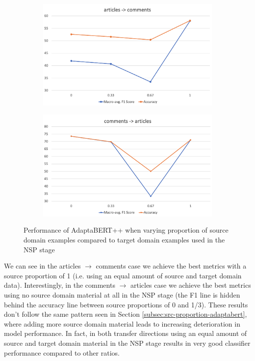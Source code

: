 \begin{figure}[ht]
    \centering
    \begin{subfigure}{\textwidth}
        \centering
        \includegraphics[scale=0.24]{0-img/ner-src-proportion-articles-comments.png}
    \end{subfigure}
    \begin{subfigure}{\textwidth}
        \centering
        \includegraphics[scale=0.24]{0-img/ner-src-proportion-comments-articles.png}
    \end{subfigure}
    \caption{Performance of AdaptaBERT++ when varying proportion of source domain examples compared to target domain examples used in the NSP stage}
    \label{fig:ner-src-proportion}
\end{figure}

We can see in the articles $ \rightarrow $ comments case we achieve the best metrics with a source proportion of 1 (i.e. using an equal amount of source and target domain data). Interestingly, in the comments $ \rightarrow $ articles case we achieve the best metrics using no source domain material at all in the NSP stage (the F1 line is hidden behind the accuracy line between source proportions of 0 and 1/3). These results don't follow the same pattern seen in Section \ref{subsec:src-proportion-adaptabert}, where adding more source domain material leads to increasing deterioration in model performance. In fact, in both transfer directions using an equal amount of source and target domain material in the NSP stage results in very good classifier performance compared to other ratios.